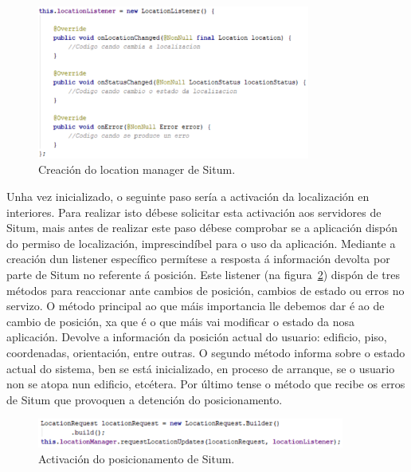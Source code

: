 \begin{figure}[htb] 
	\begin{center}
		\includegraphics[width=0.8\textwidth]{figures/codigo/situmLocationManager}
		\caption{Creación do location manager de Situm.}
		\label{fig:situmLocationManager}
	\end{center}
\end{figure}

Unha vez inicializado, o seguinte paso sería a activación da localización en interiores. Para realizar isto débese solicitar esta activación aos servidores de Situm, mais antes de realizar este paso débese comprobar se a aplicación dispón do permiso de localización, imprescindíbel para o uso da aplicación. Mediante a creación dun listener específico permítese a resposta á información devolta por parte de Situm no referente á posición. Este listener (na figura~\ref{fig:situmPosicionamento}) dispón de tres métodos para reaccionar ante cambios de posición, cambios de estado ou erros no servizo. O método principal ao que máis importancia lle debemos dar é ao de cambio de posición, xa que é o que máis vai modificar o estado da nosa aplicación. Devolve a información da posición actual do usuario: edificio, piso, coordenadas, orientación, entre outras. O segundo método informa sobre o estado actual do sistema, ben se está inicializado, en proceso de arranque, se o usuario non se atopa nun edificio, etcétera. Por último tense o método que recibe os erros de Situm que provoquen a detención do posicionamento.

\begin{figure}[htb] 
	\begin{center}
		\includegraphics[width=0.9\textwidth]{figures/codigo/situmPosicionamento}
		\caption{Activación do posicionamento de Situm.}
		\label{fig:situmPosicionamento}
	\end{center}
\end{figure}

